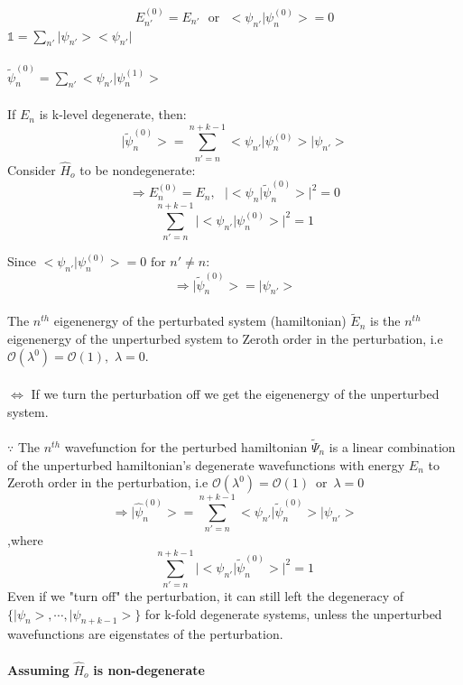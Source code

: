\documentclass[12pt,fancychapters]{report}
\numberwithin{equation}{section}
\begin{document}
$$E^{(0)}_{n'} = E_{n'}\,\,\,\,\text{or}\,\,\,\,\big< \psi_{n'} \big| \psi_n^{(0)} \big> = 0$$
$\mathbb{1} = \sum_{n'} \big|\psi_{n'}\big> \big< \psi_{n'} \big|$
\\
\\
$\tilde{\psi}_n^{(0)} = \sum_{n'} \big< \psi_{n'} \big| \psi_n^{(1)} \big> $
\\
\\
If $E_n$ is k-level degenerate, then:
\begin{equation*}
	\big| \tilde{\psi}^{(0)}_n \big> = \sum_{n'=n}^{n+k-1} \big< \psi_{n'} \big| \psi_n^{(0)} \big>
	\big|\psi_{n'} \big>
\end{equation*}
Consider $\hat{H}_o$ to be nondegenerate: 
$$
	\Longrightarrow E^{(0)}_n = E_n,\,\,\,\,\big|\big< \psi_n | \tilde{\psi}^{(0)}_n \big> \big| ^2 = 0
$$
$$\sum_{n'=n}^{n+k-1}\big| \big< \psi_{n'} \big| \psi_n^{(0)} \big> \big|^2 = 1$$

Since $ \big< \psi_{n'} \big| \psi_n^{(0)} \big> = 0\,\,\text{for }n'\neq n$:
$$\Longrightarrow \big| \tilde{\psi}^{(0)}_n \big > = \big| \psi_{n'} \big>$$
\\
The $n^{th}$ eigenenergy of the perturbated system (hamiltonian) $\tilde{E}_n$ is the $n^{th}$ 
eigenenergy of the unperturbed system to Zeroth order in the perturbation, i.e $\mathcal{O}(\lambda^0)
= \mathcal{O}(1),\,\,\lambda = 0 $.
\\
\\
$\Longleftrightarrow$ If we turn the perturbation off we get the eigenenergy of the unperturbed system.
\\
\\
$\because$ The $n^{th}$ wavefunction for the perturbed hamiltonian $\tilde{\Psi}_n$ is a linear 
combination of the unperturbed hamiltonian's degenerate wavefunctions with energy $E_n$ to Zeroth
order in the perturbation, i.e $\mathcal{O}(\lambda^0) = \mathcal{O}(1)\,\,\,\text{or}\,\,\,\lambda = 0$ 
\begin{equation*}
	\Longrightarrow \big|\hat{\psi}^{(0)}_n \big> =\sum_{n'=n}^{n+k-1}
	\big< \psi_{n'} \big|\tilde{ \psi}_n^{(0)} \big> \big|\psi_{n'}\big>
\end{equation*}
,where
$$\sum_{n'=n}^{n+k-1}\big| \big< \psi_{n'} \big| \tilde{\psi}_n^{(0)} \big> \big|^2 = 1$$
Even if we "turn off" the perturbation, it can still left the degeneracy of $\{\big|\psi_n\big>,
\cdots, \big|\psi_{n+k-1}\big>\}$ for k-fold degenerate systems, unless the unperturbed wavefunctions
are eigenstates of the perturbation.\\
\\
\textbf{Assuming } $\hat{H}_o$ \textbf{is non-degenerate}
\end{document}
